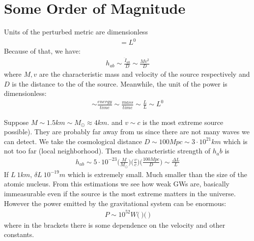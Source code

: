 \documentclass[11pt]{article}
\begin{document}
\section{Some Order of Magnitude}
Units of the perturbed metric are dimensionless
\begin{align}
[h_{ij}] = L^0
\end{align}
Because of that, we have:
\begin{align}
h_{ab} \sim \frac{\ddot{I}_{ab}}{D} \sim \frac{Mv^2}{D}
\end{align}
where $M,v$ are the characteristic mass and velocity of the source respectively and $D$ is the distance to the of the source. 
Meanwhile, the unit of the power is dimensionless:
\begin{align}
[P] \sim \frac{energy}{time} \sim \frac{mass}{time} \sim \frac{L}{L} \sim L^0
\end{align}
\begin{example}
Suppose  $M \sim 1.5km\sim M_\odot\approx 4km$. and $v \sim c$ is the most extreme source possible). They are probably far away from us since there are not many waves we can detect. We take the cosmological distance $D \sim 100Mpc \sim 3\cdot10^{21}km$ which is not too far (local neighborhood). Then the characteristic strength of $h_ab$ is
\begin{align}
h_{ab} \sim 5\cdot10^{-23}\Bigg(\frac{M}{M_\odot}\Bigg)\Bigg(\frac{v}{c}\Bigg)\Bigg(\frac{100Mpc}{D} \Bigg) \sim \frac{\Delta L}{L}
\end{align}
If $L~1km$, $\delta L~10^{-19}m$ which is extremely small. Much smaller than the size of the atomic nucleus. From this estimations we see how weak GWs are, basically immeasurable even if the source is the most extreme matters in the universe. However the power emitted by the gravitational system can be enormous:
\begin{align}
P \sim 10^{52}W\Bigg(\ \Bigg)\Bigg(\ \Bigg)
\end{align}
where in the brackets there is some dependence on the velocity and other constants.
\end{example}
\end{document}

